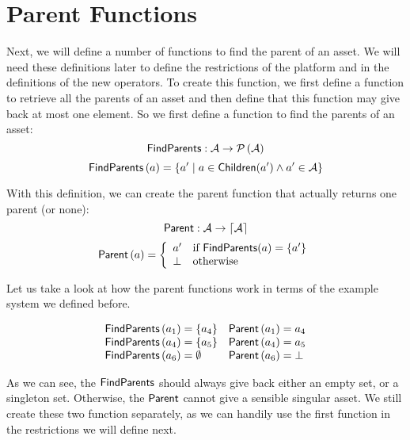 \section{Parent Functions}\label{sec:vp:parentsfunctions}
Next, we will define a number of functions to find the parent of an asset.
We will need these definitions later to define the restrictions of the platform
and in the definitions of the new operators.
To create this function, we first define a function to retrieve all the parents of an
asset and then define that this function may give back at most one element.
So we first define a function to find the parents of an asset:
\[
  {\sf FindParents} : \mathcal{A} \rightarrow \mathcal{P} \left(\mathcal{A}\right)
\]
\[
  {\sf FindParents} \left( a \right) = \left\{ a' \hspace*{1mm} \middle| \hspace*{1mm} a \in {\sf Children}(a') \land a' \in \mathcal{A} \right\}
\]

With this definition, we can create the parent function that actually returns
one parent (or none):
\[
  {\sf Parent} : \mathcal{A} \rightarrow \lceil \mathcal{A} \rceil
\]
\[
  {\sf Parent}\left( a \right) = 
  \left\{ 
    \begin{array}{ll}
      a' & \text{if } {\sf FindParents}(a) = \left\{ a' \right\} \\
      \bot & \text{otherwise}
    \end{array}
  \right.
\]

\begin{example}\label{example:parentfunc}
  Let us take a look at how the parent functions work in terms of the example
  system we defined before.

  \[
    \begin{array}{ll}
      {\sf FindParents}\left(a_1\right) = \left\{ a_4 \right\} & {\sf Parent}\left(a_1\right) = a_4 \\
      {\sf FindParents}\left(a_4\right) = \left\{ a_5 \right\} & {\sf Parent}\left(a_4\right) = a_5 \\
      {\sf FindParents}\left(a_6\right) = \emptyset & {\sf Parent}\left(a_6\right) = \bot \\
    \end{array}
  \]

  As we can see, the \({\sf FindParents}\) should always give back either an empty set, or
  a singleton set. Otherwise, the \({\sf Parent}\) cannot give a sensible singular asset.
  We still create these two function separately, as we can handily use the first function
  in the restrictions we will define next.
\end{example}

